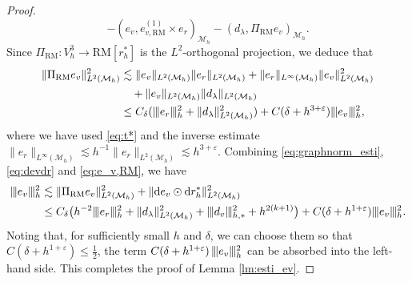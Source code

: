 \documentclass[10pt,a4paper]{amsart}
\newcommand{\Man}{\mathcal{M}}
\newcommand{\RM}{\mathrm{RM}}
\newcommand{\normt}[1]{%
	\vert\kern-0.9pt\vert\kern-0.9pt\vert #1
	\vert\kern-0.9pt\vert\kern-0.9pt\vert}
\begin{document}
\begin{proof}
\[    - (e_v, e_{v, \RM}^{(1)} \times e_r) _{\Man_h}
    - (d_{\lambda}, \Pi_{\RM} e_v)_{\Man_h}. 
\]
Since $\Pi_{\RM}: V_h^3 \to \RM[r_h^*]$ is the $L^2$-orthogonal projection, we deduce that
\begin{equation}\label{eq:e_v,RM}
\begin{aligned}
        \|\Pi_{\RM} e_v \|_{L^2(\Man_h)}^2 & \lesssim 
        \| e_v \|_{L^2(\Man_h)} \| e_r \|_{L^2(\Man_h)} + 
        \| e_r \|_{L^\infty(\Man_h)} \| e_v \|_{L^2(\Man_h)}^2\\
        & \quad + \| e_v \|_{L^2(\Man_h)} \| d_{\lambda} \|_{L^2(\Man_h)} \\ 
        & \leq C_{\delta} (\normt{e_r}_h^2 + \| d_{\lambda} \|_{L^2(\Man_h)}^2) + C(\delta + h^{3+ \varepsilon}) \normt{e_v}_h^2,
\end{aligned}
\end{equation}
where we have used  \eqref{eq:t*} and  the inverse estimate  $ \| e_r \|_{L^\infty(\Man_h)} \lesssim h^{-1} \| e_r \|_{L^2(\Man_h)} \lesssim h^{3 + \varepsilon} $.
Combining \eqref{eq:graphnorm_esti},  \eqref{eq:devdr} and \eqref{eq:e_v,RM}, we have 
\[ \begin{aligned}
    \normt{e_v}^2_h &\lesssim 
    \|\Pi_{\RM} e_v\|_{L^2(\Man_h)}^2 +  \|\mathrm{d} e_{v} \odot \mathrm{d} r_h^{*}\|_{L^2(\Man_h)}^2 \\ 
    & \leq C_{\delta}\big( h^{-2}\normt{e_r}_h^2  + \| d_{\lambda} \|_{L^2(\Man_h)}^2 + \normt{d_v}_{h,*}^2 + h^{2(k+1)} \big)
 + C(\delta + h^{1+\varepsilon}) \normt{e_v}_h^2. 
\end{aligned} \]
Noting that, for sufficiently small $h$ and $\delta$, we can choose them so that
$C(\delta + h^{1+\varepsilon}) \leq \tfrac12$, the term
$C(\delta + h^{1+\varepsilon})\,\normt{e_v}_h^2$ can be absorbed into the left-hand side.
This completes the proof of Lemma \ref{lm:esti_ev}.
\end{proof}
\end{document}
